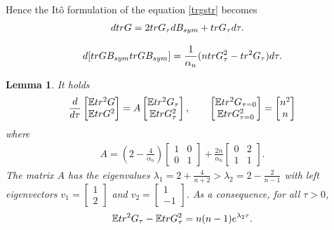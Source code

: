 \documentclass[10pt,a4paper]{amsart}
\newtheorem{lemma}{Lemma}
\def\bbE{\mathbb E}
\def\tr{{\rm tr}}
\begin{document}
Hence the Itô formulation of the equation \eqref{trgstr} becomes \begin{align}
    d\tr G &=2\tr G_\tau dB_{sym}+\tr G_\tau d\tau. \label{trg} 
\end{align} 

\begin{align}\label{qv}
    d[\tr  G B_{ sym} \tr  G B_{ sym}]=\frac{1}{\alpha_n} (n \tr  G_\tau^2-\tr^2 G_\tau )d\tau.
\end{align} 

\begin{lemma}\label{Lem:2by2}
  It holds
   \begin{align*}
    \frac{d}{d\tau}\begin{bmatrix}
        \bbE \tr^2 G \\ \bbE \tr G^2
    \end{bmatrix}  = A \begin{bmatrix}
        \bbE \tr^2 G_\tau \\ \bbE \tr G_\tau^2
    \end{bmatrix}, \quad \quad
   \begin{bmatrix}
        \bbE \tr^2 G_{\tau=0} \\ \bbE \tr  G_{\tau=0}^2
    \end{bmatrix} = \begin{bmatrix}
    n^2\\n
\end{bmatrix}
\end{align*}
%
where 
%
\begin{align*}
    A=(2-\frac{4}{\alpha_n}) \begin{bmatrix}
        1&0\\
        0&1
    \end{bmatrix}+\frac{2n}{\alpha_n}\begin{bmatrix}
        0&2\\
        1&1
    \end{bmatrix}.
\end{align*}
%
The matrix $A$ has the eigenvalues $\lambda_1=2+\frac{4}{n+2}> \lambda_2=2-\frac{2}{n-1}$ with left eigenvectors $v_1=\begin{bmatrix}
    1\\2
\end{bmatrix}$ and $v_2=\begin{bmatrix}
    1\\-1
\end{bmatrix}$. As a consequence, for all $\tau>0$, 
%
\begin{align}\label{difference}
 \bbE  \tr^2G_{\tau}-\bbE \tr G_\tau^2  = n(n-1) e^{\lambda_2\tau}.  
\end{align}
%
\end{lemma}
\end{document}
